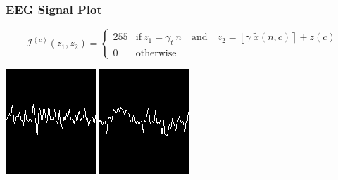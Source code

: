 \documentclass[aspectratio=169]{beamer}
\begin{document}
	\begin{frame}
	\frametitle{EEG Signal Plot}
	\begin{center}
	
\begin{equation}
\mathcal{I}^{(c)}(z_1,z_2) = \left\{ \begin{array}{rl}
255 & \text{if} \   z_1 = \gamma_{t} \  n \quad \text{and}  \quad z_2 = \left\lfloor \gamma \; \tilde{x}(n,c) \right\rceil + z(c) \\
0   & \mbox{otherwise}
\end{array}\right.
\label{eq:images}
\end{equation}

		\includegraphics[scale=2]{images/SignalSample.png} 
		\includegraphics[scale=2]{images/SignalSample2.png} 
		

        \end{center}
    \end{frame}


    
\end{document}
